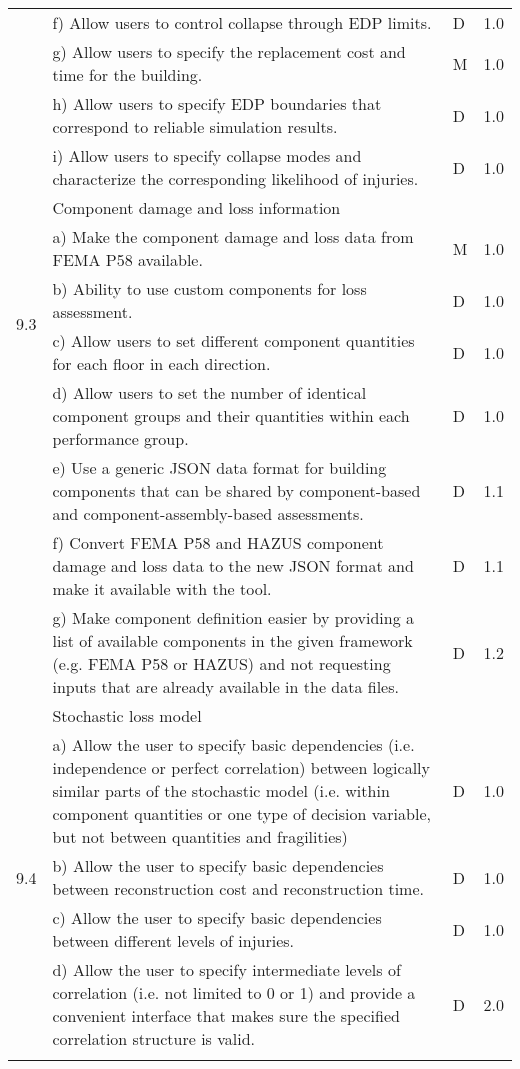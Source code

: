{\begin{longtable}{| p{} | p{} | p{} | p{} |}
{     & f) Allow users to control collapse through EDP limits. & D & 1.0\\
     & g) Allow users to specify the replacement cost and time for the building. & M & 1.0 \\
     & h) Allow users to specify EDP boundaries that correspond to reliable simulation results. & D & 1.0\\
     & i) Allow users to specify collapse modes and characterize the corresponding likelihood of injuries. & D & 1.0\\ \hline
	\multirow{5}{*}{9.3} & Component damage and loss information & & \\
	 & a) Make the component damage and loss data from FEMA P58 available. & M & 1.0 \\
	 & b) Ability to use custom components for loss assessment. & D & 1.0 \\
	 & c) Allow users to set different component quantities for each floor in each direction. & D & 1.0 \\
	 & d) Allow users to set the number of identical component groups and their quantities within each performance group. & D & 1.0 \\
     & e) Use a generic JSON data format for building components that can be shared by component-based and component-assembly-based assessments. & D & 1.1 \\
	 & f) Convert FEMA P58 and HAZUS component damage and loss data to the new JSON format and make it available with the tool. & D & 1.1 \\
	 & g) Make component definition easier by providing a list of available components in the given framework (e.g. FEMA P58 or HAZUS) and not requesting inputs that are already available in the data files. & D & 1.2 \\ \hline
	 \multirow{5}{*}{9.4} & Stochastic loss model & & \\
	 & a) Allow the user to specify basic dependencies (i.e. independence or perfect correlation) between logically similar parts of the stochastic model (i.e. within component quantities or one type of decision variable, but not between quantities and fragilities) & D & 1.0 \\
	 & b) Allow the user to specify basic dependencies between reconstruction cost and reconstruction time. & D & 1.0 \\
	 & c) Allow the user to specify basic dependencies between different levels of injuries. & D & 1.0 \\
	 & d) Allow the user to specify intermediate levels of correlation (i.e. not limited to 0 or 1) and provide a convenient interface that makes sure the specified correlation structure is valid. & D & 2.0 \\ \hline    
}
\end{longtable}}
